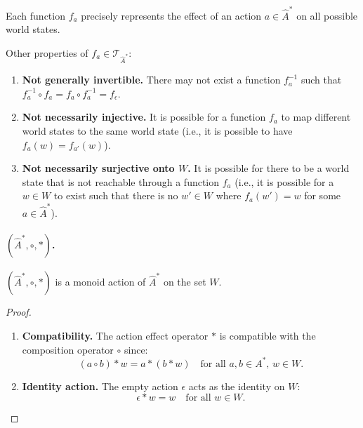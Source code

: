
Each function $f_{a}$ precisely represents the effect of an action $a \in \hat{A}^{*}$ on all possible world states.

Other properties of $f_{a} \in \mathcal{T}_{\hat{A}^{\ast}}$:
\begin{enumerate}[(1)]
    \item \textbf{Not generally invertible.}
    There may not exist a function $f_{a}^{-1}$ such that $f_{a}^{-1} \circ f_{a} = f_{a} \circ f_{a}^{-1} = f_{\epsilon}$.
    \item \textbf{Not necessarily injective.}
    It is possible for a function $f_{a}$ to map different world states to the same world state (i.e., it is possible to have $f_{a}(w) = f_{a'}(w)$).
    \item \textbf{Not necessarily surjective onto $W$.}
    It is possible for there to be a world state that is not reachable through a function $f_{a}$ (i.e., it is possible for a $w \in W$ to exist such that there is no $w' \in W$ where $f_{a}(w') = w$ for some $a \in \hat{A}^{\ast}$).
\end{enumerate}


\paragraph{$(\hat{A}^{\ast}, \circ, \ast)$.}
\begin{proposition}
    $(\hat{A}^{\ast}, \circ, \ast)$ is a monoid action of $\hat{A}^{\ast}$ on the set $W$.
\end{proposition}
\begin{proof}
    \begin{enumerate}[(1)]
        \item \textbf{Compatibility.}
        The action effect operator $\ast$ is compatible with the composition operator $\circ$ since:
        \begin{equation}
            (a \circ b) \ast w = a \ast (b \ast w) \quad \text{for all } a, b \in A^{\ast}, \, w \in W.
        \end{equation}

        \item \textbf{Identity action.}
        The empty action $\epsilon$ acts as the identity on $W$:
        \begin{equation}
            \epsilon \ast w = w \quad \text{for all } w \in W.
        \end{equation}

    \end{enumerate}
\end{proof}

